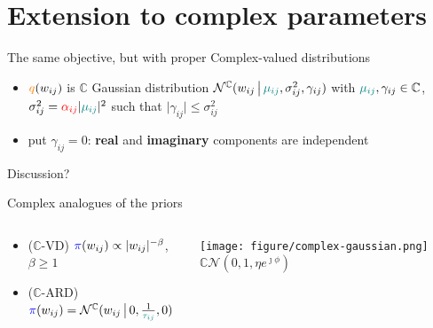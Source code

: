 \documentclass{beamer}
\newcommand{\cplx}{\mathbb{C}}
\begin{document}


\section{Extension to complex parameters} %
\label{sec:extension_to_complex_parameters}

\begin{frame}[c]{\insertsection}
The same objective, but with proper Complex-valued distributions
\begin{itemize}
  \item $
    {\color{orange} q}(w_{ij})
  $ is $\cplx$ Gaussian distribution $
    \mathcal{N}^{\cplx}(
      w_{ij}\,\big\vert\,
      {\color{teal} \mu_{ij}},
      \sigma^2_{ij},
      \gamma_{ij}
    )
  $ with $
    {\color{teal} \mu_{ij}}, \gamma_{ij} \in \cplx
  $, $
    \sigma^2_{ij}
      = {\color{red} \alpha_{ij}}
        \lvert {\color{teal} \mu_{ij}} \rvert^2
  $ such that $\lvert \gamma_{ij}\rvert \leq \sigma^2_{ij}$
  \item put $\gamma_{ij} = 0$: 
    \textbf{real} and \textbf{imaginary} components are independent
\end{itemize} 

Discussion?

\medskip
Complex analogues of the priors
\begin{columns}[T]
  \begin{column}{0.63\linewidth}
    \begin{itemize}
      \item ($\cplx$-VD) $
        {\color{blue} \pi}(w_{ij})
            \propto \lvert w_{ij}\rvert^{-\beta}
      $, $\beta \geq 1$
      \smallskip
      \item ($\cplx$-ARD) $
        {\color{blue} \pi}(w_{ij})
            = \mathcal{N}^{\cplx}(
              w_{ij}\,\big\vert\,
              0, \tfrac1{{\color{teal} \tau_{ij}}}, 0
            )
      $
    \end{itemize}
  \end{column}
  \begin{column}{0.35\linewidth}
    \texttt{[image: figure/complex-gaussian.png]}
    {
      $\mathbb{C}\mathcal{N}(0, 1, \eta e^{\jmath \phi})$
    }
  \end{column}
\end{columns}

\end{frame}
\end{document}
